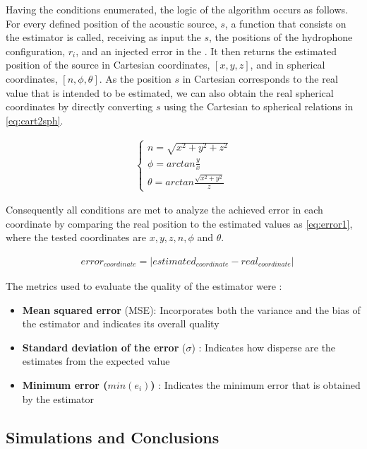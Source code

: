 Having the conditions enumerated, the logic of the algorithm occurs as follows. For every defined position of the acoustic source, $s$, a function that consists on the estimator is called, receiving as input the $s$, the positions of the hydrophone configuration, $r_i$, and an injected error in the . It then returns the estimated position of the source in Cartesian coordinates, $[x,y,z]$, and in spherical coordinates, $[n, \phi, \theta]$. As the position $s$ in Cartesian corresponds to the real value that is intended to be estimated, we can also obtain the real spherical coordinates by directly converting $s$ using the Cartesian to spherical relations in \ref{eq:cart2sph}.

\begin{eqnarray}
\begin{cases} 
n =  \sqrt{x^2 + y^2 + z^2}\\ 
\phi  = arctan \frac{y}{x}\\ 
\theta =  arctan \frac{\sqrt{x^2+y^2}}{z}
\end{cases}
\label{eq:cart2sph}
\end{eqnarray}

Consequently all conditions are met to analyze the achieved error in each coordinate by comparing the real position to the estimated values as \ref{eq:error1}, where the tested coordinates are $x, y, z, n, \phi$ and $\theta$.

\begin{eqnarray}
&error_{coordinate} = |estimated_{coordinate} - real_{coordinate}|
\label{eq:error1}
\end{eqnarray}

The metrics used to evaluate the quality of the estimator were :

\begin{itemize}
	\item \textbf{Mean squared error} (MSE): Incorporates both the variance and the bias of the estimator and indicates its overall quality
	\item \textbf{Standard deviation of the error} ($\sigma$) : Indicates how disperse are the estimates from the expected value
	\item \textbf{Minimum error ($min(e_i)$)} : Indicates the minimum error that is obtained by the estimator
\end{itemize} 

\subsection{Simulations and Conclusions}

